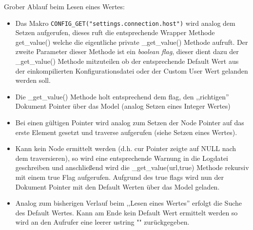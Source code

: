 Grober Ablauf beim Lesen eines Wertes:
\begin{itemize}


   \item Das Makro \verb+CONFIG_GET("settings.connection.host")+ wird analog dem Setzen aufgerufen, dieses ruft die entsprechende Wrapper
   Methode get\_value() welche die eigentliche private \_get\_value() Methode aufruft.
   Der zweite Parameter dieser Methode ist ein \emph{boolean flag}, dieser dient dazu der \_get\_value()
   Methode mitzuteilen ob der entsprechende Default Wert aus der einkompilierten 
   Konfigurationsdatei oder der Custom User Wert gelanden werden soll.
   \item Die \_get\_value() Methode holt entsprechend dem flag, den ,,richtigen'' Dokument Pointer über das Model (analog Setzen eines Integer Wertes)
   \item Bei einen gültigen Pointer wird analog zum Setzen der Node Pointer auf das erste Element gesetzt und traverse
      aufgerufen (siehe Setzen eines Wertes).
   \item Kann kein Node ermittelt werden (d.h. cur Pointer zeigte auf NULL nach dem traversieren), so wird eine entsprechende Warnung in die Logdatei geschreiben und anschließend wird die \_get\_value(url,true) Methode rekursiv mit einem true Flag aufgerufen. Aufgrund des true flags wird nun der Dokument Pointer mit den Default Werten über das Model geladen.
    \item Analog zum bisherigen Verlauf beim ,,Lesen eines Wertes'' erfolgt die Suche des Default Wertes. Kann am Ende kein
    Default Wert ermittelt werden so wird an den Aufrufer eine leerer ustring "" zurückgegeben.
\end{itemize}










